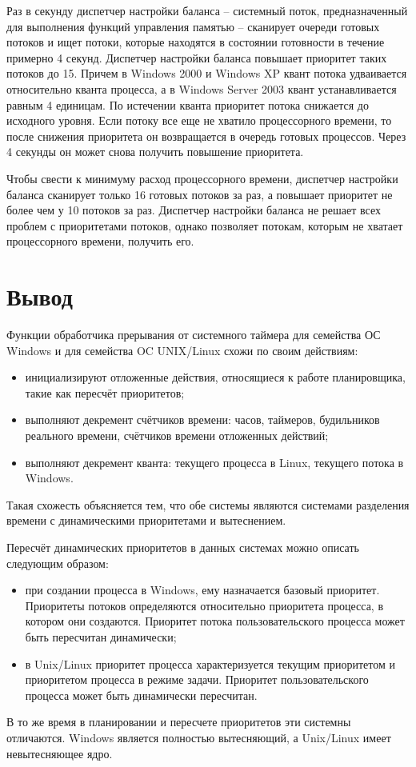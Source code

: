 Раз в секунду диспетчер настройки баланса -- системный поток, предназначенный для выполнения функций управления памятью -- сканирует очереди готовых потоков и ищет потоки, которые находятся в состоянии готовности в течение примерно 4 секунд. Диспетчер настройки баланса повышает приоритет таких потоков до 15. Причем в {\ttfamily Windows 2000} и {\ttfamily Windows XP} квант потока удваивается относительно кванта процесса, а в {\ttfamily Windows Server 2003} квант устанавливается равным 4 единицам. По истечении кванта приоритет потока снижается до исходного уровня. Если потоку все еще не хватило процессорного времени, то после снижения приоритета он возвращается в очередь готовых процессов. Через 4 секунды он может снова получить повышение приоритета.

Чтобы свести к минимуму расход процессорного времени, диспетчер настройки баланса сканирует только 16 готовых потоков за раз, а повышает приоритет не более чем у 10 потоков за раз.
Диспетчер настройки баланса не решает всех проблем с приоритетами потоков, однако позволяет потокам, которым не хватает процессорного времени, получить его.

\chapter*{Вывод}

Функции обработчика прерывания от системного таймера для семейства ОС {\ttfamily Windows} и для семейства OC {\ttfamily UNIX/Linux} схожи по своим действиям:
\begin{itemize}
	\item инициализируют отложенные действия, относящиеся к работе планировщика, такие как пересчёт приоритетов;
	\item выполняют декремент счётчиков времени: часов, таймеров, будильников реального времени, счётчиков времени отложенных действий;
	\item выполняют декремент кванта: текущего процесса в {\ttfamily Linux}, текущего потока в {\ttfamily Windows}.
\end{itemize}

Такая схожесть объясняется тем, что обе системы являются системами разделения времени с динамическими приоритетами и вытеснением.


Пересчёт динамических приоритетов в данных системах можно описать следующим образом:

\begin{itemize}
	\item при создании процесса в {\ttfamily Windows}, ему назначается базовый приоритет. Приоритеты потоков определяются относительно приоритета процесса, в котором они создаются. Приоритет потока пользовательского процесса может быть пересчитан динамически;
	
	\item в {\ttfamily Unix/Linux} приоритет процесса характеризуется текущим приоритетом и приоритетом процесса в режиме задачи. Приоритет пользовательского процесса может быть динамически пересчитан.
\end{itemize}

В то же время в планировании и пересчете приоритетов эти системны отличаются. 
Windows является полностью вытесняющий, а Unix/Linux имеет невытесняющее ядро. 
